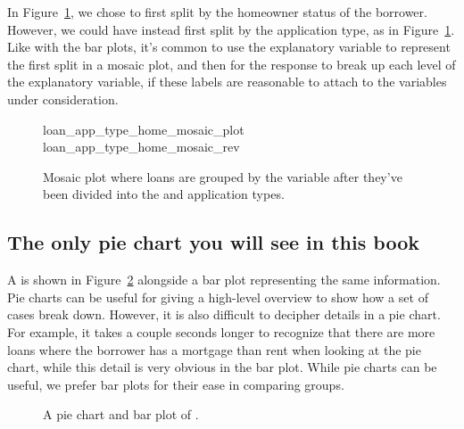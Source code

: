 In Figure~\ref{loan_app_type_home_mosaic_rev},
we chose to first split by the homeowner status
of the borrower.
However, we could have instead first split by
the application type, as in
Figure~\ref{loan_app_type_home_mosaic_rev}.
Like with the bar plots, it's common to use
the explanatory variable to represent the
first split in a mosaic plot,
and then for the response to break
up each level of the explanatory variable,
if these labels are reasonable to attach to
the variables under consideration.

\begin{figure}[h]
  \centering
      {loan_app_type_home_mosaic_plot}
      {loan_app_type_home_mosaic_rev}
  \caption{Mosaic plot where loans are grouped by
      the  variable after they've
      been divided into the  and
       application types.}
  \label{loan_app_type_home_mosaic_rev}
\end{figure}



\subsection{The only pie chart you will see in this book}

A  is shown in
Figure~\ref{loan_homeownership_pie_chart} alongside
a bar plot representing the same information.
Pie charts can be useful for giving a high-level overview
to show how a set of cases break down.
However, it is also difficult to decipher details
in a pie chart.
For example, it takes a couple seconds longer to recognize
that there are more loans where the borrower has
a mortgage than rent when looking at the pie chart,
while this detail is very obvious in the bar plot.
While pie charts can be useful, we prefer bar plots
for their ease in comparing groups.

\begin{figure}[h]
  \centering
  \caption{A pie chart and bar plot of .}
  \label{loan_homeownership_pie_chart}
\end{figure}

